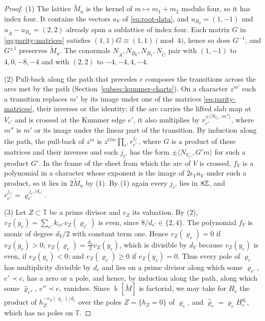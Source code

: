 \begin{proof}
(1) The lattice $\widetilde M_u$ is the kernel of $m\mapsto m_1+m_2$ modulo
four, so it has index four.  It contains the vectors $u_V$ of
\eqref{eq:root-data}, and $u_{B_0}=(1,-1)$ and
$u_{\widetilde A}-u_{B_0}=(2,2)$ already span a sublattice of index four.
Each matrix $G$ in \eqref{eq:parity-matrices} satisfies
$(1,1)G\equiv(1,1)\pmod 4$, hence so does $G^{-1}$, and $G^{\pm1}$ preserves
$\widetilde M_u$.  The conormals $N_{\widetilde A},N_{B_0},N_{B_1},
N_{\widetilde C}$ pair with $(1,-1)$ to $4,0,-8,-4$ and with $(2,2)$ to
$-4,-4,4,-4$.

(2) Pull-back along the path that precedes $e$ composes the
transitions across the arcs met by the path
(Section~\ref{subsec:kummer-charts}).  On a character $z^{m'}$ such a
transition replaces $m'$ by its image under one of the matrices
\eqref{eq:parity-matrices}, their inverses or the identity; if the arc
carries the lifted slab map at $V_{e'}$ and is crossed at the Kummer edge $e'$,
it also multiplies by $r_{e'}^{\pm\langle N_{V_{e'}},m''\rangle}$, where $m''$ is
$m'$ or its image under the linear part of the transition.  By induction
along the path, the pull-back of $z^m$ is $z^{Gm}\prod_{e'}
r_{e'}^{j_{e'}}$, where $G$ is a product of these matrices and their
inverses and each $j_{e'}$ has the form $\pm\langle N_{V_{e'}},G'm\rangle$ for
such a product $G'$.  In the frame of the sheet from which the arc of $V$
is crossed, $f_V$ is a polynomial in a character whose exponent is the image
of $2\epsilon_Vu_V$ under such a product, so it lies in $2\widetilde M_u$ by
(1).  By (1) again every $j_{e'}$ lies in $8\mathbb Z$, and
$r_{e'}^{j_{e'}}=\varrho_{e'}^{\,j_{e'}/d_{e'}}$.

(3) Let $Z\subset\mathbb T$ be a prime divisor and $v_Z$ its valuation.  By (2),
$v_Z(y_e)=\sum_{e'}k_{ee'}v_Z(\varrho_{e'})$ is even, since
$8/d_{e'}\in\{2,4\}$.  The polynomial $f_V$ is monic of degree
$d_V/2$ with constant term one.  Hence $v_Z(\varrho_e)=0$ if
$v_Z(y_e)>0$; $v_Z(\varrho_e)=\frac{d_V}2v_Z(y_e)$, which is divisible by
$d_V$ because $v_Z(y_e)$ is even, if $v_Z(y_e)<0$; and
$v_Z(\varrho_e)\geq0$ if $v_Z(y_e)=0$.  Thus every pole of $\varrho_e$ has
multiplicity divisible by $d_e$ and lies on a prime divisor along which
some $\varrho_{e'}$, $e'\prec e$, has a zero or a pole, and hence, by
induction along the path, along which some $\widehat\varrho_{e''}$, $e''\prec e$,
vanishes.  Since $\Bbbk[\widetilde M]$ is factorial, we may take for $H_e$
the product of $h_Z^{-v_Z(\varrho_e)/d_e}$ over the poles $Z=\{h_Z=0\}$ of
$\varrho_e$, and $\widehat\varrho_e=\varrho_eH_e^{d_e}$, which has no poles on $\mathbb T$.
\end{proof}


